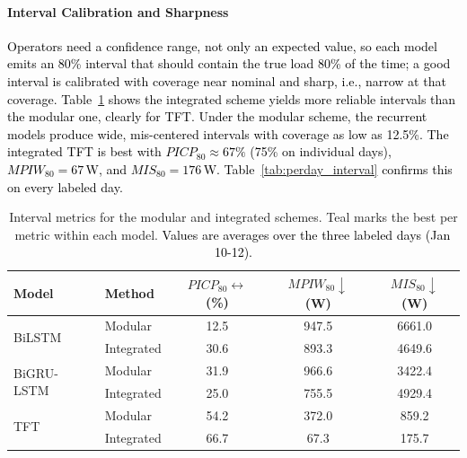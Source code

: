 \documentclass[final,10pt,1p,authoryear]{elsarticle}
\theoremstyle{definition}
\begin{document}
\paragraph{Interval Calibration and Sharpness}
\textcolor{black}{Operators need a confidence range, not only an expected value, so each model emits an 80\% interval that should contain the true load 80\% of the time; a good interval is calibrated with coverage near nominal and sharp, i.e., narrow at that coverage. Table~\ref{tab:prob_all} shows the integrated scheme yields more reliable intervals than the modular one, clearly for TFT. Under the modular scheme, the recurrent models produce wide, mis-centered intervals with coverage as low as 12.5\%. The integrated TFT is best with ${PICP}_{80}\approx67\%$ (75\% on individual days), ${MPIW}_{80}=67$\,W, and ${MIS}_{80}=176$\,W. Table~\ref{tab:perday_interval} confirms this on every labeled day.}
\begin{table}[!htbp]
\centering
\caption{Interval metrics for the modular and integrated schemes. \colorbox{goodcell}{Teal} marks the best per metric within each model. \textcolor{black}{Values are averages over the three labeled days (Jan\,10-12).}}
\label{tab:prob_all}
\begin{tabular}{llccc}
\toprule
Model & Method & ${PICP}_{80}\leftrightarrow$ (\%) & ${MPIW}_{80}\downarrow$ (W) & ${MIS}_{80}\downarrow$ (W) \\
\midrule
\multirow{2}{*}{BiLSTM} 
 & Modular    & 12.5 & 947.5 & 6661.0 \\
 & Integrated & \cellcolor{goodcell}30.6 & \cellcolor{goodcell}893.3 & \cellcolor{goodcell}4649.6 \\
\midrule
\multirow{2}{*}{BiGRU-LSTM} 
 & Modular    & \cellcolor{goodcell}31.9 & 966.6 & \cellcolor{goodcell}3422.4 \\
 & Integrated & 25.0 & \cellcolor{goodcell}755.5 & 4929.4 \\
\midrule
\multirow{2}{*}{TFT} 
 & Modular    & 54.2 & 372.0 & 859.2 \\
 & Integrated & \cellcolor{goodcell}66.7 & \cellcolor{goodcell}67.3 & \cellcolor{goodcell}175.7 \\
\bottomrule
\end{tabular}
\end{table}
\end{document}
